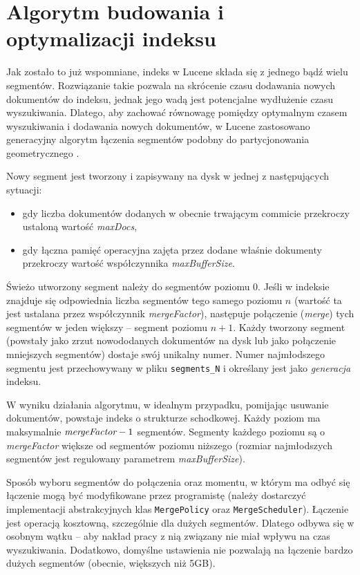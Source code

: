\section{Algorytm budowania i optymalizacji indeksu}
\label{sec:segments}

Jak zostało to już wspomniane, indeks w Lucene składa się z jednego bądź wielu segmentów. Rozwiązanie takie pozwala na skrócenie czasu dodawania nowych dokumentów do indeksu, jednak jego wadą jest potencjalne wydłużenie czasu wyszukiwania. Dlatego, aby zachować równowagę pomiędzy optymalnym czasem wyszukiwania i dodawania nowych dokumentów, w Lucene zastosowano generacyjny algorytm łączenia segmentów podobny do partycjonowania geometrycznego \cite{geopart}. 

Nowy segment jest tworzony i zapisywany na dysk w jednej z następujących sytuacji:
\begin{itemize}
 \item gdy liczba dokumentów dodanych w obecnie trwającym commicie przekroczy ustaloną wartość \emph{maxDocs},
 \item gdy łączna pamięć operacyjna zajęta przez dodane właśnie dokumenty przekroczy wartość współczynnika \emph{maxBufferSize}.
\end{itemize}
Świeżo utworzony segment należy do segmentów poziomu 0. Jeśli w indeksie znajduje się odpowiednia liczba segmentów tego samego poziomu $n$ (wartość ta jest ustalana przez współczynnik \emph{mergeFactor}), następuje połączenie (\emph{merge}) tych segmentów w jeden większy -- segment poziomu $n+1$. Każdy tworzony segment (powstały jako zrzut nowododanych dokumentów na dysk lub jako połączenie mniejszych segmentów) dostaje swój unikalny numer. Numer najmłodszego segmentu jest przechowywany w pliku \texttt{segments\_N} i określany jest jako \emph{generacja} indeksu.

W wyniku działania algorytmu, w idealnym przypadku, pomijając usuwanie dokumentów, powstaje indeks o strukturze schodkowej. Każdy poziom ma maksymalnie $\emph{mergeFactor} - 1$ segmentów. Segmenty każdego poziomu są o \emph{mergeFactor} większe od segmentów poziomu niższego (rozmiar najmłodszych segmentów jest regulowany parametrem \emph{maxBufferSize}).

Sposób wyboru segmentów do połączenia oraz momentu, w którym ma odbyć się łączenie mogą być modyfikowane przez programistę (należy dostarczyć implementacji abstrakcyjnych klas \texttt{MergePolicy} oraz \texttt{MergeScheduler}). Łączenie jest operacją kosztowną, szczególnie dla dużych segmentów. Dlatego odbywa się w osobnym wątku -- aby nakład pracy z nią związany nie miał wpływu na czas wyszukiwania. Dodatkowo, domyślne ustawienia nie pozwalają na łączenie bardzo dużych segmentów (obecnie, większych niż 5GB).

